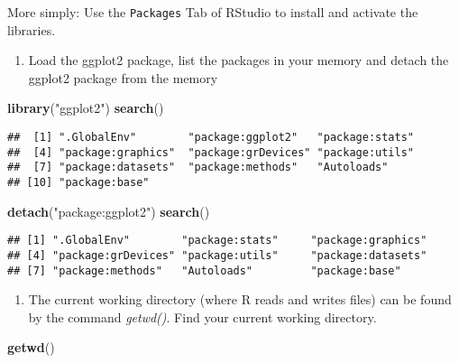 \documentclass[]{article}
\newenvironment{Shaded}{\begin{snugshade}}{\end{snugshade}}
\newcommand{\KeywordTok}[1]{\textcolor[rgb]{0.13,0.29,0.53}{\textbf{#1}}}
\newcommand{\StringTok}[1]{\textcolor[rgb]{0.31,0.60,0.02}{#1}}
\newcommand{\NormalTok}[1]{#1}
\providecommand{\tightlist}{%
  \setlength{\itemsep}{0pt}\setlength{\parskip}{0pt}}
\begin{document}
More simply: Use the \texttt{Packages} Tab of RStudio to install and
activate the libraries.

\begin{enumerate}
\def\labelenumi{\arabic{enumi}.}
\setcounter{enumi}{3}
\tightlist
\item
  Load the ggplot2 package, list the packages in your memory and detach
  the ggplot2 package from the memory
\end{enumerate}

\begin{Shaded}
\begin{Highlighting}[]
\KeywordTok{library}\NormalTok{(}\StringTok{"ggplot2"}\NormalTok{)}
\KeywordTok{search}\NormalTok{()}
\end{Highlighting}
\end{Shaded}

\begin{verbatim}
##  [1] ".GlobalEnv"        "package:ggplot2"   "package:stats"    
##  [4] "package:graphics"  "package:grDevices" "package:utils"    
##  [7] "package:datasets"  "package:methods"   "Autoloads"        
## [10] "package:base"
\end{verbatim}

\begin{Shaded}
\begin{Highlighting}[]
\KeywordTok{detach}\NormalTok{(}\StringTok{"package:ggplot2"}\NormalTok{)}
\KeywordTok{search}\NormalTok{()}
\end{Highlighting}
\end{Shaded}

\begin{verbatim}
## [1] ".GlobalEnv"        "package:stats"     "package:graphics" 
## [4] "package:grDevices" "package:utils"     "package:datasets" 
## [7] "package:methods"   "Autoloads"         "package:base"
\end{verbatim}

\begin{enumerate}
\def\labelenumi{\arabic{enumi}.}
\setcounter{enumi}{4}
\tightlist
\item
  The current working directory (where R reads and writes files) can be
  found by the command \emph{getwd()}. Find your current working
  directory.
\end{enumerate}

\begin{Shaded}
\begin{Highlighting}[]
\KeywordTok{getwd}\NormalTok{()}
\end{Highlighting}
\end{Shaded}
\end{document}
